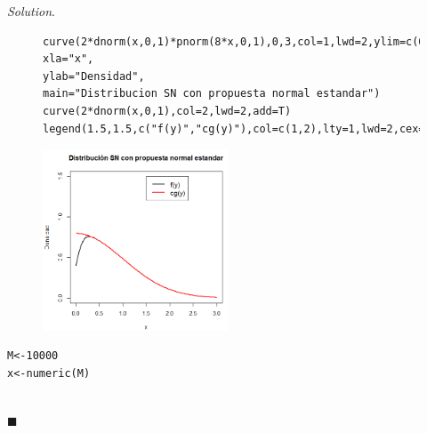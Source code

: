 \documentclass[11pt]{article}
\renewcommand{\=}[1]{\stackrel{#1}{=}} %
\theoremstyle{definition}
\theoremstyle{remark}
\newenvironment{solution}{%
\begin{trivlist} \item \textit{Solution}. }{%
\hspace*{\fill} $\blacksquare$\end{trivlist}}
\begin{document}
\begin{itemize}
\begin{solution}
	\begin{figure}[h]
	\hspace*{0.9cm}\begin{minipage}{10.3cm}
		{
			\begin{lstlisting}[style=myRstyle, caption={Distribución de interés y distribución normal estándar / SN.}]
curve(2*dnorm(x,0,1)*pnorm(8*x,0,1),0,3,col=1,lwd=2,ylim=c(0,1.5),
xla="x",
ylab="Densidad",
main="Distribucion SN con propuesta normal estandar")
curve(2*dnorm(x,0,1),col=2,lwd=2,add=T)
legend(1.5,1.5,c("f(y)","cg(y)"),col=c(1,2),lty=1,lwd=2,cex=1.2)
			\end{lstlisting}
		}			
	\end{minipage}
	\begin{minipage}{6cm}
		\includegraphics[width=5.5cm]{a1}
	\end{minipage}

\end{figure}
		{
	\begin{lstlisting}[style=myRstyle, caption={Algoritmo de aceptación y rechazo.}]
M<-10000
x<-numeric(M)


\end{lstlisting}}
\end{solution}
\end{itemize}
\end{document}
